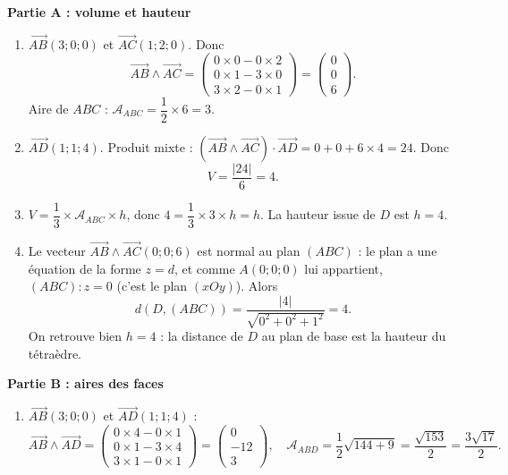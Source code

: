 \documentclass[11pt]{article}
\begin{document}
\begin{corrige}
\textbf{Partie A : volume et hauteur}
\begin{enumerate}
\item $\overrightarrow{AB}(3 ; 0 ; 0)$ et $\overrightarrow{AC}(1 ; 2 ; 0)$. Donc
\[ \overrightarrow{AB} \wedge \overrightarrow{AC} = \begin{pmatrix} 0\times 0 - 0\times 2 \\ 0\times 1 - 3\times 0 \\ 3\times 2 - 0\times 1 \end{pmatrix} = \begin{pmatrix} 0 \\ 0 \\ 6 \end{pmatrix}. \]
Aire de $ABC$ : $\mathcal{A}_{ABC} = \dfrac{1}{2}\times 6 = 3$.
\item $\overrightarrow{AD}(1 ; 1 ; 4)$. Produit mixte : $\left(\overrightarrow{AB} \wedge \overrightarrow{AC}\right) \cdot \overrightarrow{AD} = 0 + 0 + 6\times 4 = 24$. Donc
\[ V = \dfrac{|24|}{6} = 4. \]
\item $V = \dfrac{1}{3} \times \mathcal{A}_{ABC} \times h$, donc $4 = \dfrac{1}{3}\times 3 \times h = h$. La hauteur issue de $D$ est $h = 4$.
\item Le vecteur $\overrightarrow{AB} \wedge \overrightarrow{AC}(0 ; 0 ; 6)$ est normal au plan $(ABC)$ : le plan a une équation de la forme $z = d$, et comme $A(0;0;0)$ lui appartient, $(ABC) : z = 0$ (c'est le plan $(xOy)$). Alors
\[ d(D, (ABC)) = \dfrac{|4|}{\sqrt{0^2+0^2+1^2}} = 4. \]
On retrouve bien $h = 4$ : la distance de $D$ au plan de base est la hauteur du tétraèdre.
\end{enumerate}
\textbf{Partie B : aires des faces}
\begin{enumerate}[resume]
\item $\overrightarrow{AB}(3 ; 0 ; 0)$ et $\overrightarrow{AD}(1 ; 1 ; 4)$ :
\[ \overrightarrow{AB} \wedge \overrightarrow{AD} = \begin{pmatrix} 0\times 4 - 0\times 1 \\ 0\times 1 - 3\times 4 \\ 3\times 1 - 0\times 1 \end{pmatrix} = \begin{pmatrix} 0 \\ -12 \\ 3 \end{pmatrix}, \quad \mathcal{A}_{ABD} = \dfrac{1}{2}\sqrt{144 + 9} = \dfrac{\sqrt{153}}{2} = \dfrac{3\sqrt{17}}{2}. \]

\end{enumerate}
\end{corrige}
\end{document}
